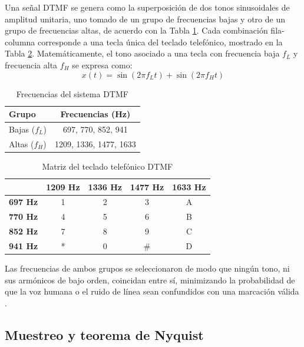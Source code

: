 \documentclass[conference]{IEEEtran}
\begin{document}
Una señal DTMF se genera como la superposición de dos tonos sinusoidales de amplitud unitaria, uno tomado de un grupo de frecuencias bajas y otro de un grupo de frecuencias altas, de acuerdo con la Tabla \ref{tab:dtmf_freqs}. Cada combinación fila-columna corresponde a una tecla única del teclado telefónico, mostrado en la Tabla \ref{tab:dtmf_keypad}. Matemáticamente, el tono asociado a una tecla con frecuencia baja $f_L$ y frecuencia alta $f_H$ se expresa como:
\begin{equation}
x(t) = \sin(2\pi f_L t) + \sin(2\pi f_H t)
\label{eq:dtmf_signal}
\end{equation}

\begin{table}[!t]
\centering
\caption{Frecuencias del sistema DTMF \cite{itu-q23}}
\label{tab:dtmf_freqs}
\begin{tabular}{|l|c|}
\hline
\textbf{Grupo} & \textbf{Frecuencias (Hz)} \\ \hline
Bajas ($f_L$) & 697, 770, 852, 941 \\ \hline
Altas ($f_H$) & 1209, 1336, 1477, 1633 \\ \hline
\end{tabular}
\end{table}

\begin{table}[!t]
\centering
\caption{Matriz del teclado telefónico DTMF}
\label{tab:dtmf_keypad}
\begin{tabular}{|c|c|c|c|c|}
\hline
 & \textbf{1209 Hz} & \textbf{1336 Hz} & \textbf{1477 Hz} & \textbf{1633 Hz} \\ \hline
\textbf{697 Hz} & 1 & 2 & 3 & A \\ \hline
\textbf{770 Hz} & 4 & 5 & 6 & B \\ \hline
\textbf{852 Hz} & 7 & 8 & 9 & C \\ \hline
\textbf{941 Hz} & * & 0 & \# & D \\ \hline
\end{tabular}
\end{table}

Las frecuencias de ambos grupos se seleccionaron de modo que ningún tono, ni sus armónicos de bajo orden, coincidan entre sí, minimizando la probabilidad de que la voz humana o el ruido de línea sean confundidos con una marcación válida \cite{itu-q23}.

\subsection{Muestreo y teorema de Nyquist}
\end{document}
